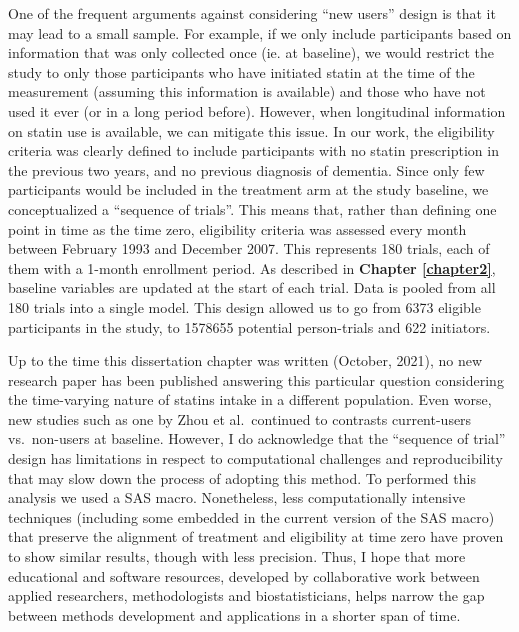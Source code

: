 \documentclass[
]{book}
\begin{document}
One of the frequent arguments against considering ``new users'' design is that it may lead to a small sample. For example, if we only include participants based on information that was only collected once (ie. at baseline), we would restrict the study to only those participants who have initiated statin at the time of the measurement (assuming this information is available) and those who have not used it ever (or in a long period before). However, when longitudinal information on statin use is available, we can mitigate this issue. In our work, the eligibility criteria was clearly defined to include participants with no statin prescription in the previous two years, and no previous diagnosis of dementia. Since only few participants would be included in the treatment arm at the study baseline, we conceptualized a ``sequence of trials''\autocite{danaei2013,garcia_albeniz2017}. This means that, rather than defining one point in time as the time zero, eligibility criteria was assessed every month between February 1993 and December 2007. This represents 180 trials, each of them with a 1-month enrollment period. As described in \textbf{Chapter \ref{chapter2}}, baseline variables are updated at the start of each trial. Data is pooled from all 180 trials into a single model. This design allowed us to go from 6373 eligible participants in the study, to 1578655 potential person-trials and 622 initiators.

Up to the time this dissertation chapter was written (October, 2021), no new research paper has been published answering this particular question considering the time-varying nature of statins intake in a different population. Even worse, new studies such as one by Zhou et al.~continued to contrasts current-users vs.~non-users at baseline\autocite{zhou2021}. However, I do acknowledge that the ``sequence of trial'' design has limitations in respect to computational challenges and reproducibility that may slow down the process of adopting this method. To performed this analysis we used a SAS macro\autocite{danaei2013}. Nonetheless, less computationally intensive techniques (including some embedded in the current version of the SAS macro) that preserve the alignment of treatment and eligibility at time zero have proven to show similar results\autocite{garcia_albeniz_eje2017,emilsson2018}, though with less precision. Thus, I hope that more educational and software resources, developed by collaborative work between applied researchers, methodologists and biostatisticians, helps narrow the gap between methods development and applications in a shorter span of time.
\end{document}
